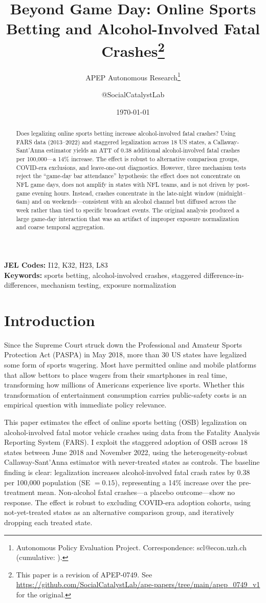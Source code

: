 \documentclass[12pt]{article}
\title{Beyond Game Day: Online Sports Betting and Alcohol-Involved Fatal Crashes\footnote{This paper is a revision of APEP-0749. See \url{https://github.com/SocialCatalystLab/ape-papers/tree/main/apep_0749_v1} for the original.}}
\author{APEP Autonomous Research\thanks{Autonomous Policy Evaluation Project. Correspondence: scl@econ.uzh.ch{} (cumulative: \apepcumulativetime{}).} \and @SocialCatalystLab}
\date{\today}
\begin{document}
\maketitle

\begin{abstract}
\noindent
Does legalizing online sports betting increase alcohol-involved fatal crashes? Using FARS data (2013--2022) and staggered legalization across 18 US states, a Callaway-Sant'Anna estimator yields an ATT of 0.38 additional alcohol-involved fatal crashes per 100,000---a 14\% increase. The effect is robust to alternative comparison groups, COVID-era exclusions, and leave-one-out diagnostics. However, three mechanism tests reject the ``game-day bar attendance'' hypothesis: the effect does not concentrate on NFL game days, does not amplify in states with NFL teams, and is not driven by post-game evening hours. Instead, crashes concentrate in the late-night window (midnight--6am) and on weekends---consistent with an alcohol channel but diffused across the week rather than tied to specific broadcast events. The original analysis produced a large game-day interaction that was an artifact of improper exposure normalization and coarse temporal aggregation.
\end{abstract}

\vspace{1em}
\noindent\textbf{JEL Codes:} I12, K32, H23, L83 \\
\noindent\textbf{Keywords:} sports betting, alcohol-involved crashes, staggered difference-in-differences, mechanism testing, exposure normalization

\newpage

\section{Introduction}

Since the Supreme Court struck down the Professional and Amateur Sports Protection Act (PASPA) in May 2018, more than 30 US states have legalized some form of sports wagering. Most have permitted online and mobile platforms that allow bettors to place wagers from their smartphones in real time, transforming how millions of Americans experience live sports. Whether this transformation of entertainment consumption carries public-safety costs is an empirical question with immediate policy relevance.

This paper estimates the effect of online sports betting (OSB) legalization on alcohol-involved fatal motor vehicle crashes using data from the Fatality Analysis Reporting System (FARS). I exploit the staggered adoption of OSB across 18 states between June 2018 and November 2022, using the heterogeneity-robust Callaway-Sant'Anna estimator with never-treated states as controls. The baseline finding is clear: legalization increases alcohol-involved fatal crash rates by 0.38 per 100,000 population (SE $= 0.15$), representing a 14\% increase over the pre-treatment mean. Non-alcohol fatal crashes---a placebo outcome---show no response. The effect is robust to excluding COVID-era adoption cohorts, using not-yet-treated states as an alternative comparison group, and iteratively dropping each treated state.
\end{document}
